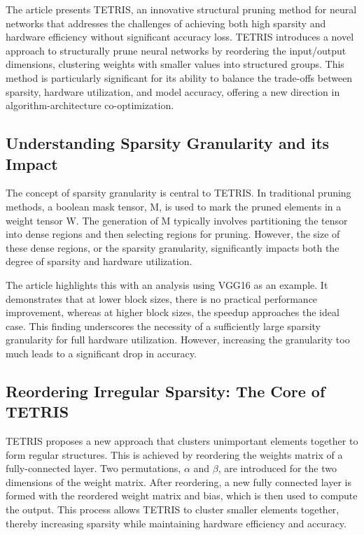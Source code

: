 The article presents TETRIS, an innovative structural pruning method for neural networks that addresses the challenges of achieving both high sparsity and hardware efficiency without significant accuracy loss. TETRIS introduces a novel approach to structurally prune neural networks by reordering the input/output dimensions, clustering weights with smaller values into structured groups. This method is particularly significant for its ability to balance the trade-offs between sparsity, hardware utilization, and model accuracy, offering a new direction in algorithm-architecture co-optimization.

\subsection{Understanding Sparsity Granularity and its Impact}

The concept of sparsity granularity is central to TETRIS. In traditional pruning methods, a boolean mask tensor, M, is used to mark the pruned elements in a weight tensor W. The generation of M typically involves partitioning the tensor into dense regions and then selecting regions for pruning. However, the size of these dense regions, or the sparsity granularity, significantly impacts both the degree of sparsity and hardware utilization.

The article highlights this with an analysis using VGG16 as an example. It demonstrates that at lower block sizes, there is no practical performance improvement, whereas at higher block sizes, the speedup approaches the ideal case. This finding underscores the necessity of a sufficiently large sparsity granularity for full hardware utilization. However, increasing the granularity too much leads to a significant drop in accuracy.

\subsection{Reordering Irregular Sparsity: The Core of TETRIS}

TETRIS proposes a new approach that clusters unimportant elements together to form regular structures. This is achieved by reordering the weights matrix of a fully-connected layer. Two permutations, $\alpha$ and $\beta$, are introduced for the two dimensions of the weight matrix. After reordering, a new fully connected layer is formed with the reordered weight matrix and bias, which is then used to compute the output. This process allows TETRIS to cluster smaller elements together, thereby increasing sparsity while maintaining hardware efficiency and accuracy.

